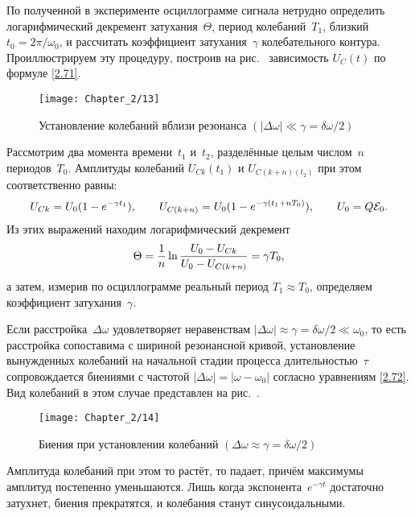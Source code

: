 По полученной в эксперименте осциллограмме сигнала нетрудно определить
логарифмический декремент затухания~$\Theta$, период колебаний~$T_1$, близкий
$t_0=2\pi/\omega_0$, и рассчитать коэффициент затухания~$\gamma$ колебательного
контура. Проиллюстрируем эту процедуру, построив на рис.~
зависимость $U_C(t)$ по формуле \eqref{2.71}.

\begin{figure}[h!]
	\centering\texttt{[image: Chapter\_2/13]}
	\caption{Установление колебаний вблизи резонанса
$(|\Delta\omega|\ll\gamma=\delta\omega/2)$}
\end{figure}

Рассмотрим два момента времени~$t_1$ и~$t_2$, разделённые целым числом~$n$
периодов~$T_0$. Амплитуды колебаний $U_{Ck}(t_1)$ и $U_{C(k+n)(t_2)}$ при этом
соответственно равны:
\begin{equation}\eqmark{2.74}
U_{Ck}=U_0(1-e^{-\gamma t_1}), \qquad U_{C(k+n)}=U_0(1-e^{-\gamma(t_1+nT_0)}),
\qquad U_0=Q\mathcal{E}_0.
\end{equation}
Из этих выражений находим логарифмический декремент
\begin{equation}\eqmark{2.75}
\Theta=\dfrac{1}{n}\ln\dfrac{U_0-U_{Ck}}{U_0-U_{C(k+n)}}=\gamma T_0,
\end{equation}
а затем, измерив по осциллограмме реальный период $T_1\approx T_0$, определяем
коэффициент затухания~$\gamma$.

Если расстройка~$\Delta\omega$ удовлетворяет неравенствам
$|\Delta\omega|\approx\gamma=\delta\omega/2\ll\omega_0$, то есть расстройка
сопоставима с шириной резонансной кривой, установление вынужденных колебаний на
начальной стадии процесса длительностью~$\tau$ сопровождается биениями с
частотой $|\Delta\omega|=|\omega-\omega_0|$ согласно уравнениям \eqref{2.72}.
Вид колебаний в этом случае представлен на рис.~.

\begin{figure}[h!]
	\centering\texttt{[image: Chapter\_2/14]}
	\caption{Биения при установлении колебаний
$(\Delta\omega\approx\gamma=\delta\omega/2)$}
\end{figure}

Амплитуда колебаний при этом то растёт, то падает, причём максимумы амплитуд
постепенно уменьшаются. Лишь когда экспонента~$e^{-\gamma t}$ достаточно
затухнет, биения прекратятся, и колебания станут синусоидальными.

